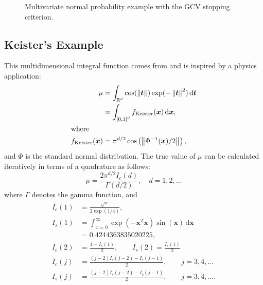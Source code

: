 \documentclass[graybox,footinfo]{svmult}
\newcommand{\bm}[1]{\boldsymbol{#1}}
\newcommand{\dif}[1]{\text{d}{#1}}
\newcommand{\reals}{\mathbb{R}}
\newcommand{\vt}{\bm{t}}
\newcommand{\vx}{\bm{x}}
\newcommand{\dvx}{\dif{\bm{x}}}
\newcommand{\dvt}{\dif{\bm{t}}}
\newcommand{\norm}[2][{}]{\ensuremath{\left \lVert #2 \right \rVert}_{#1}}
\begin{document}
{{{{{{\begin{figure}
\caption[Sobol: MVN guaranteed: GCV]{Multivariate normal probability example with the GCV stopping criterion.}
\label{fig:Sobol-mvn-guaranteed-GCV}
\end{figure}






\subsection{Keister's Example}

This multidimensional integral function comes from \cite{Kei96} and is inspired by a physics application:
\begin{align}
\label{eqn:keister_integral}
\mu & =  \int_{\reals^d} \cos(\norm{ \vt}) \exp(-\norm{ \vt }^2) \, \dvt \\
\nonumber
& = \int_{[0,1]^d} f_{\textup{Keister}}(\vx) \, \dvx,\\
\intertext{where }
\nonumber
f_\textup{Keister}(\vx) &= \pi^{d/2} \cos\left(\norm{ \Phi^{-1}(\vx)/2}\right)  ,
\end{align}
and $\Phi$ is the standard normal distribution.
The true value of $\mu$ can be calculated iteratively in terms of a quadrature as follows:  
\begin{equation*}
\mu = \frac{2 \pi^{d/2} I_c(d)}{\Gamma(d/2)}, \quad d=1,2, \ldots
\end{equation*}
where $\Gamma$ denotes the gamma function, and
\begin{align*}
I_c(1) &= \frac{\sqrt{\pi}}{2 \exp(1/4)}, 
\\
I_s(1) &= \int_{x=0}^\infty \exp(-\vx^T\vx)\sin(\vx) \, \dvx 
\\
& =  0.4244363835020225,
\\
I_c(2) &= \frac{1-I_s(1)}{2}, \qquad
I_s(2) = \frac{I_c(1)}{2}
\\
I_c(j) &= \frac{(j-2)I_c(j-2)-I_s(j-1)}{2},
\qquad j =3,4,\ldots
\\
I_s(j) &= \frac{(j-2)I_s(j-2)-I_c(j-1)}{2},
\qquad j =3,4,\ldots.
\end{align*}


}}}}}}
\end{document}
